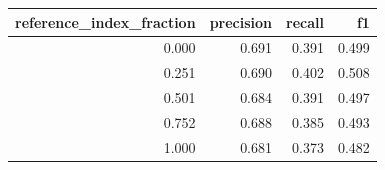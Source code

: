 \begin{tabular}{rrrr}
\toprule
reference\_index\_fraction & precision & recall & f1 \\
\midrule
0.000 & 0.691 & 0.391 & 0.499 \\
0.251 & 0.690 & 0.402 & 0.508 \\
0.501 & 0.684 & 0.391 & 0.497 \\
0.752 & 0.688 & 0.385 & 0.493 \\
1.000 & 0.681 & 0.373 & 0.482 \\
\bottomrule
\end{tabular}
